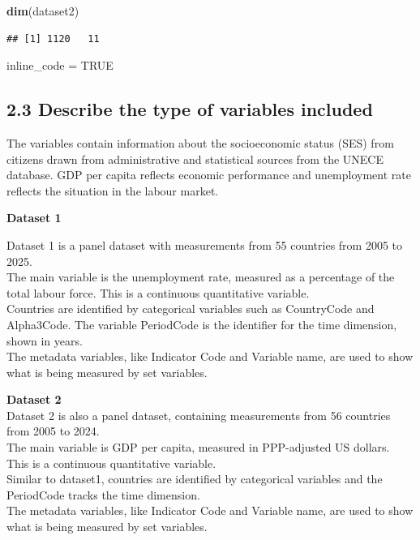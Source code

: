 \documentclass[
]{article}
\newenvironment{Shaded}{\begin{snugshade}}{\end{snugshade}}
\newcommand{\ConstantTok}[1]{\textcolor[rgb]{0.56,0.35,0.01}{#1}}
\newcommand{\FunctionTok}[1]{\textcolor[rgb]{0.13,0.29,0.53}{\textbf{#1}}}
\newcommand{\NormalTok}[1]{#1}
\newcommand{\OtherTok}[1]{\textcolor[rgb]{0.56,0.35,0.01}{#1}}
\begin{document}
\begin{Shaded}
\begin{Highlighting}[]
\FunctionTok{dim}\NormalTok{(dataset2)}
\end{Highlighting}
\end{Shaded}

\begin{verbatim}
## [1] 1120   11
\end{verbatim}

\begin{Shaded}
\begin{Highlighting}[]
\NormalTok{inline\_code }\OtherTok{=} \ConstantTok{TRUE}
\end{Highlighting}
\end{Shaded}

\subsection{2.3 Describe the type of variables
included}\label{describe-the-type-of-variables-included}

The variables contain information about the socioeconomic status (SES)
from citizens drawn from administrative and statistical sources from the
UNECE database. GDP per capita reflects economic performance and
unemployment rate reflects the situation in the labour market.

\textbf{Dataset 1}~

Dataset 1 is a panel dataset with measurements from 55 countries from
2005 to 2025.\\
The main variable is the unemployment rate, measured as a percentage of
the total labour force. This is a continuous quantitative variable.\\
Countries are identified by categorical variables such as CountryCode
and Alpha3Code. The variable PeriodCode is the identifier for the time
dimension, shown in years.\\
The metadata variables, like Indicator Code and Variable name, are used
to show what is being measured by set variables.

\textbf{Dataset 2}~\\
Dataset 2 is also a panel dataset, containing measurements from 56
countries from 2005 to 2024.\\
The main variable is GDP per capita, measured in PPP-adjusted US
dollars. This is a continuous quantitative variable.\\
Similar to dataset1, countries are identified by categorical variables
and the PeriodCode tracks the time dimension.\\
The metadata variables, like Indicator Code and Variable name, are used
to show what is being measured by set variables.
\end{document}
